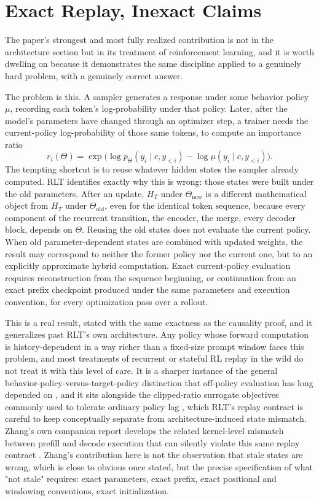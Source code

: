 \documentclass[11pt]{article}
\begin{document}
\section{Exact Replay, Inexact Claims}
\label{sec:exact-replay-inexact}

The paper's strongest and most fully realized contribution is not in the architecture section but in its treatment of reinforcement learning, and it is worth dwelling on because it demonstrates the same discipline applied to a genuinely hard problem, with a genuinely correct answer.

The problem is this. A sampler generates a response under some behavior policy $\mu$, recording each token's log-probability under that policy. Later, after the model's parameters have changed through an optimizer step, a trainer needs the current-policy log-probability of those same tokens, to compute an importance ratio
\[
r_i(\Theta) = \exp\big(\log p_\Theta(y_i \mid c, y_{<i}) - \log \mu(y_i \mid c, y_{<i})\big).
\]
The tempting shortcut is to reuse whatever hidden states the sampler already computed. RLT identifies exactly why this is wrong: those states were built under the old parameters. After an update, $H_T$ under $\Theta_{\text{new}}$ is a different mathematical object from $H_T$ under $\Theta_{\text{old}}$, even for the identical token sequence, because every component of the recurrent transition, the encoder, the merge, every decoder block, depends on $\Theta$. Reusing the old states does not evaluate the current policy. When old parameter-dependent states are combined with updated weights, the result may correspond to neither the former policy nor the current one, but to an explicitly approximate hybrid computation. Exact current-policy evaluation requires reconstruction from the sequence beginning, or continuation from an exact prefix checkpoint produced under the same parameters and execution convention, for every optimization pass over a rollout.

This is a real result, stated with the same exactness as the causality proof, and it generalizes past RLT's own architecture. Any policy whose forward computation is history-dependent in a way richer than a fixed-size prompt window faces this problem, and most treatments of recurrent or stateful RL replay in the wild do not treat it with this level of care. It is a sharper instance of the general behavior-policy-versus-target-policy distinction that off-policy evaluation has long depended on \cite{precup2000offpolicy,sutton2018rl}, and it sits alongside the clipped-ratio surrogate objectives commonly used to tolerate ordinary policy lag \cite{schulman2017ppo}, which RLT's replay contract is careful to keep conceptually separate from architecture-induced state mismatch. Zhang's own companion report develops the related kernel-level mismatch between prefill and decode execution that can silently violate this same replay contract \cite{zhang2026kernel}. Zhang's contribution here is not the observation that stale states are wrong, which is close to obvious once stated, but the precise specification of what "not stale" requires: exact parameters, exact prefix, exact positional and windowing conventions, exact initialization.
\end{document}
